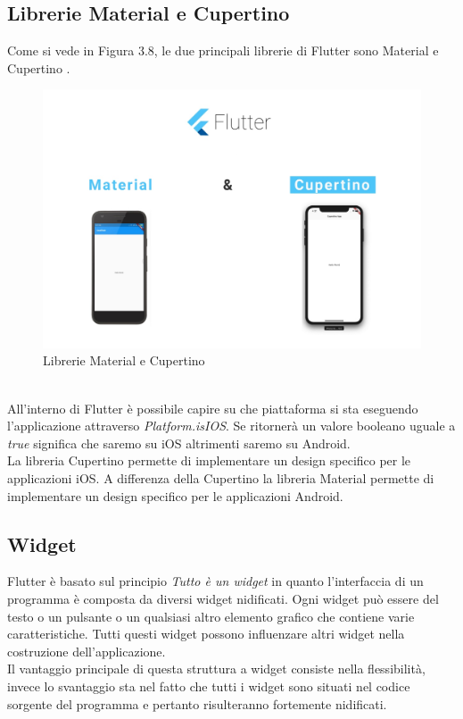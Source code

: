 \subsection{Librerie Material e Cupertino}
Come si vede in Figura 3.8, le due principali librerie di Flutter sono Material e Cupertino \cite{flutterd}. \\ 
\begin{figure}[htbp]	
	\centering
	\includegraphics[width=14cm]{immagini/librerieCM.jpg}
	\caption{Librerie Material e Cupertino \cite{lib}}
	\label{fig:Librerie Material e Cupertino}
\end{figure}
\\
All'interno di Flutter è possibile capire su che piattaforma si sta eseguendo l'applicazione attraverso \textit{Platform.isIOS}.
 Se ritornerà un valore booleano uguale a \textit{true} significa che saremo su iOS altrimenti saremo su Android.\\
La libreria Cupertino permette di implementare un design specifico per le applicazioni iOS.
A differenza della Cupertino la libreria Material permette di implementare un design specifico per le applicazioni Android.

\subsection{Widget}
\label{sec:Widget}
Flutter è basato sul principio \textit{Tutto è un widget} \cite{flutterprogramma} in quanto l'interfaccia di un programma è composta da diversi widget nidificati.
Ogni widget può essere del testo o un pulsante o un qualsiasi altro elemento grafico che contiene varie caratteristiche.
Tutti questi widget possono influenzare altri widget nella costruzione dell'applicazione.\\
Il vantaggio principale di questa struttura a widget consiste nella flessibilità, invece lo svantaggio sta nel fatto che tutti i widget sono situati nel codice sorgente del programma e pertanto risulteranno fortemente nidificati.

